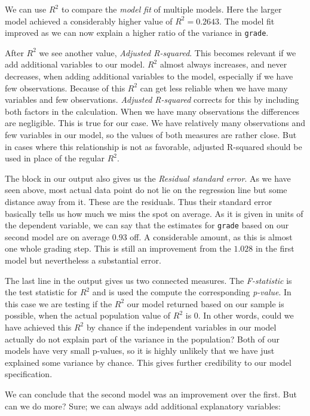 \documentclass[
]{book}
\begin{document}
We can use \(R^2\) to compare the \emph{model fit} of multiple models. Here the larger model achieved a considerably higher value of \(R^2 = 0.2643\). The model fit improved as we can now explain a higher ratio of the variance in \texttt{grade}.

After \(R^2\) we see another value, \emph{Adjusted R-squared}. This becomes relevant if we add additional variables to our model. \(R^2\) almost always increases, and never decreases, when adding additional variables to the model, especially if we have few observations. Because of this \(R^2\) can get less reliable when we have many variables and few observations. \emph{Adjusted R-squared} corrects for this by including both factors in the calculation. When we have many observations the differences are negligible. This is true for our case. We have relatively many observations and few variables in our model, so the values of both measures are rather close. But in cases where this relationship is not as favorable, adjusted R-squared should be used in place of the regular \(R^2\).

The block in our output also gives us the \emph{Residual standard error}. As we have seen above, most actual data point do not lie on the regression line but some distance away from it. These are the residuals. Thus their standard error basically tells us how much we miss the spot on average. As it is given in units of the dependent variable, we can say that the estimates for \texttt{grade} based on our second model are on average \(0.93\) off. A considerable amount, as this is almost one whole grading step. This is still an improvement from the \(1.028\) in the first model but nevertheless a substantial error.

The last line in the output gives us two connected measures. The \emph{F-statistic} is the test statistic for \(R^2\) and is used the compute the corresponding \emph{p-value}. In this case we are testing if the \(R^2\) our model returned based on our sample is possible, when the actual population value of \(R^2\) is \(0\). In other words, could we have achieved this \(R^2\) by chance if the independent variables in our model actually do not explain part of the variance in the population? Both of our models have very small p-values, so it is highly unlikely that we have just explained some variance by chance. This gives further credibility to our model specification.

We can conclude that the second model was an improvement over the first. But can we do more? Sure; we can always add additional explanatory variables:
\end{document}

